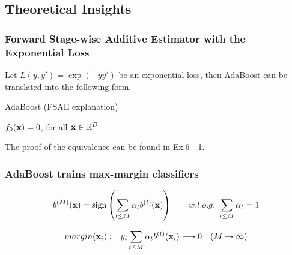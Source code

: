 
\subsection{Theoretical Insights}
\subsubsection{Forward Stage-wise Additive Estimator with the Exponential Loss}
Let $L(y, y') = \exp(-y y')$ be an exponential loss, then AdaBoost can be translated into the following form.

\begin{algorithm}[h]
\caption{AdaBoost (FSAE explanation) \label{alg:fsae}}
\SetAlgoLined
$f_0(\mathbf{x}) = 0$, for all $\mathbf{x} \in \mathbb{R}^D$\;
\end{algorithm}

The proof of the equivalence can be found in Ex.6 - 1.


\subsubsection{AdaBoost trains max-margin classifiers}

	\begin{align}
	b^{(M)}(\mathbf{x}) = \operatorname*{sign}\left(\sum_{t \leq M} \alpha_t b^{(t)}(\mathbf{x}) \right) \qquad w.l.o.g.\ \sum_{t \leq M} \alpha_t = 1
\end{align}

\begin{align}
	margin(\mathbf{x}_i) := y_i \sum_{t \leq M}  \alpha_t b^{(t)}(\mathbf{x}_i) \longrightarrow 0 \quad ({M \rightarrow \infty})
\end{align}


